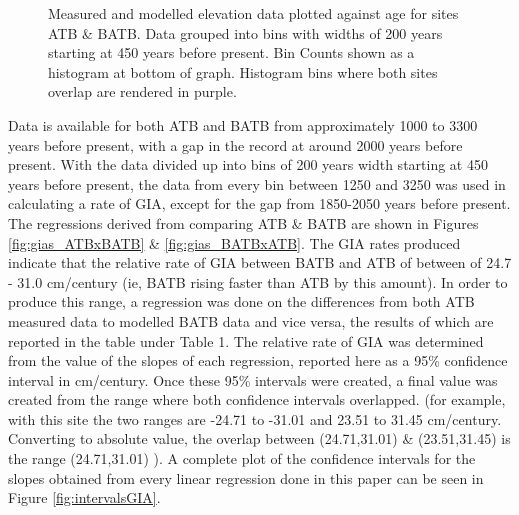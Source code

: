 \begin{figure}[H]
	\caption{Measured and modelled elevation data plotted against age for sites ATB \& BATB. Data grouped into bins with widths of 200 years starting at 450 years before present. Bin Counts shown as a histogram at bottom of graph. Histogram bins where both sites overlap are rendered in purple.}
	\label{fig:data_ATBxBATB}
\end{figure}
 Data is available for both ATB and BATB from
 approximately 1000 to 3300 years before present,
 with a gap in the record at around 2000 years before present. With the data divided up into bins of 200 years width
 starting at 450 years before present, the data from every bin between 1250 and 3250 was used
 in calculating a rate of GIA, except for the gap from 1850-2050 years before
 present. The regressions derived from comparing ATB \& BATB are shown
 in Figures \ref{fig:gias_ATBxBATB} \& \ref{fig:gias_BATBxATB}. The GIA rates produced
  indicate that the relative rate of GIA between BATB and ATB of
 between of 24.7 - 31.0 cm/century (ie, BATB rising faster than ATB by this amount). In order to produce this range, a
 regression was done on the differences from both ATB measured data to modelled
 BATB data and vice versa, the results of which are reported in
 the table under Table 1. The relative rate of GIA was determined from the
 value of the slopes of each regression, reported here as a 95\% confidence interval
 in cm/century. Once these 95\% intervals were created, a final value was created
 from the range where both confidence intervals overlapped. (for example, with this
 site the two ranges are -24.71 to -31.01 and 23.51 to 31.45 cm/century. Converting
 to absolute value, the overlap between (24.71,31.01) \& (23.51,31.45) is the range
 (24.71,31.01) ). A complete plot of the confidence intervals
 for the slopes obtained from every linear regression done in this paper can be seen in Figure \ref{fig:intervalsGIA}. \\


